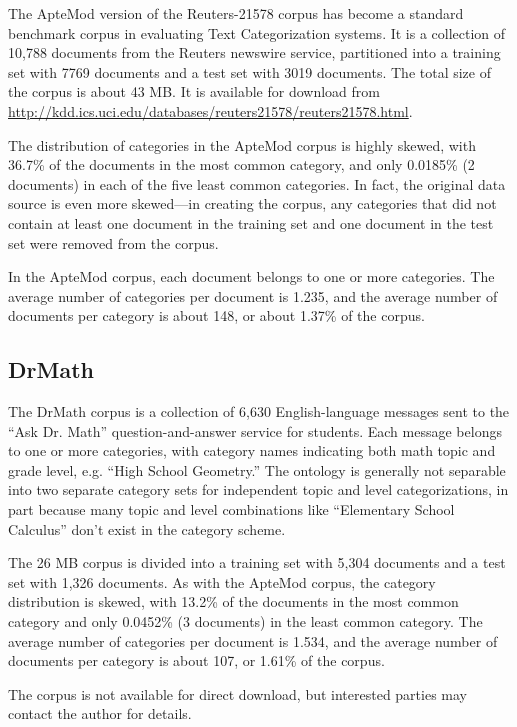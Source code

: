 The ApteMod version of the Reuters-21578 corpus has become a
standard benchmark corpus in evaluating Text Categorization
systems.\cite{yang:99} It is a collection of 10,788 documents from the
Reuters newswire service, partitioned into a training set with 7769
documents and a test set with 3019 documents.  The total size of the
corpus is about 43 MB.  It is available for download from
\url{http://kdd.ics.uci.edu/databases/reuters21578/reuters21578.html}.

The distribution of categories in the ApteMod corpus is highly skewed,
with 36.7\% of the documents in the most common category, and only
0.0185\% (2 documents) in each of the five least common categories.
In fact, the original data source is even more skewed---in creating
the corpus, any categories that did not contain at least one document
in the training set and one document in the test set were removed from
the corpus.\cite{yang:99}

In the ApteMod corpus, each document belongs to one or more
categories.  The average number of categories per document is 1.235,
and the average number of documents per category is about 148, or
about 1.37\% of the corpus.

\subsection{DrMath}

The DrMath corpus is a collection of 6,630 English-language messages
sent to the ``Ask Dr. Math'' question-and-answer service for
students.\cite{drmath} Each message belongs to one or more categories,
with category names indicating both math topic and grade level,
e.g. ``High School Geometry.''  The ontology is generally not
separable into two separate category sets for independent topic and
level categorizations, in part because many topic and level
combinations like ``Elementary School Calculus'' don't exist in the
category scheme.

The 26 MB corpus is divided into a training set with 5,304 documents
and a test set with 1,326 documents.  As with the ApteMod corpus, the
category distribution is skewed, with 13.2\% of the documents in the
most common category and only 0.0452\% (3 documents) in the least
common category.  The average number of categories per document is
1.534, and the average number of documents per category is about 107,
or 1.61\% of the corpus.

The corpus is not available for direct download, but interested
parties may contact the author for details.


